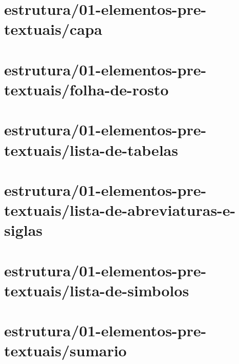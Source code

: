 
\chapter{estrutura/01-elementos-pre-textuais/capa} %
\chapter{estrutura/01-elementos-pre-textuais/folha-de-rosto} %
\chapter{estrutura/01-elementos-pre-textuais/lista-de-tabelas}
\chapter{estrutura/01-elementos-pre-textuais/lista-de-abreviaturas-e-siglas}
\chapter{estrutura/01-elementos-pre-textuais/lista-de-simbolos}
\chapter{estrutura/01-elementos-pre-textuais/sumario} %